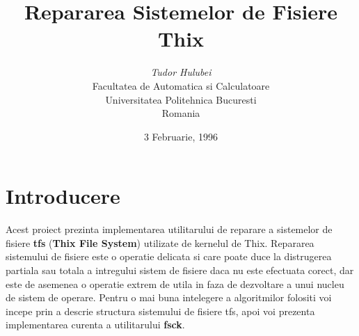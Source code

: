 	 

\def\a#1{
	{\bf #1}
}
\def\bi{
	\hspace*{0.0cm}
}
\def\bia{
	\hspace*{0.6cm}
}
\def\bib{
	\hspace*{1.2cm}
}
\def\bic{
	\hspace*{1.8cm}
}
\def\bid{
	\hspace*{2.4cm}
}
\def\bie{
	\hspace*{3.0cm}
}
\def\bif{
	\hspace*{3.6cm}
}
\def\big{
	\hspace*{4.2cm}
}
\def\bih{
	\hspace*{4.8cm}
}

\def\thefootnote{\fnsymbol{footnote}}

\title{\bf Repararea Sistemelor de Fisiere Thix}

\author{{\em Tudor Hulubei}\\
        Facultatea de Automatica si Calculatoare\\
	Universitatea Politehnica Bucuresti\\
        Romania}

\date{3 Februarie, 1996}



\maketitle



\large

\setlength{\parskip}{7pt plus 2pt minus 1pt}


\section{Introducere}


Acest proiect prezinta implementarea utilitarului de reparare a
sistemelor de fisiere {\bf tfs} ({\bf Thix File System}) utilizate de
kernelul de Thix.  Repararea sistemului de fisiere este o operatie
delicata si care poate duce la distrugerea partiala sau totala a
intregului sistem de fisiere daca nu este efectuata corect, dar este
de asemenea o operatie extrem de utila in faza de dezvoltare a unui
nucleu de sistem de operare.  Pentru o mai buna intelegere a
algoritmilor folositi voi incepe prin a descrie structura sistemului
de fisiere tfs, apoi voi prezenta implementarea curenta a utilitarului
{\bf fsck}.


